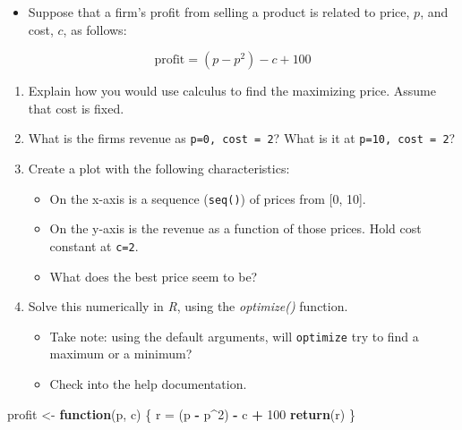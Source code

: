 \documentclass[
]{book}
\newenvironment{Shaded}{\begin{snugshade}}{\end{snugshade}}
\newcommand{\ControlFlowTok}[1]{\textcolor[rgb]{0.13,0.29,0.53}{\textbf{#1}}}
\newcommand{\DecValTok}[1]{\textcolor[rgb]{0.00,0.00,0.81}{#1}}
\newcommand{\FunctionTok}[1]{\textcolor[rgb]{0.13,0.29,0.53}{\textbf{#1}}}
\newcommand{\NormalTok}[1]{#1}
\newcommand{\OtherTok}[1]{\textcolor[rgb]{0.56,0.35,0.01}{#1}}
\newcommand{\SpecialCharTok}[1]{\textcolor[rgb]{0.81,0.36,0.00}{\textbf{#1}}}
\providecommand{\tightlist}{%
  \setlength{\itemsep}{0pt}\setlength{\parskip}{0pt}}
\theoremstyle{definition}
\theoremstyle{definition}
\theoremstyle{definition}
\theoremstyle{definition}
\theoremstyle{remark}
\begin{document}
\begin{itemize}
\tightlist
\item
  Suppose that a firm's profit from selling a product is related to price, \(p\), and cost, \(c\), as follows:
\end{itemize}

\[ 
\text{profit} = (p - p^2) - c + 100
\]

\begin{enumerate}
\def\labelenumi{\arabic{enumi}.}
\item
  Explain how you would use calculus to find the maximizing price. Assume that cost is fixed.
\item
  What is the firms revenue as \texttt{p=0,\ cost\ =\ 2}? What is it at \texttt{p=10,\ cost\ =\ 2}?
\item
  Create a plot with the following characteristics:

  \begin{itemize}
  \tightlist
  \item
    On the x-axis is a sequence (\texttt{seq()}) of prices from {[}0, 10{]}.
  \item
    On the y-axis is the revenue as a function of those prices. Hold cost constant at \texttt{c=2}.\\
  \item
    What does the best price seem to be?
  \end{itemize}
\item
  Solve this numerically in \emph{R}, using the \emph{optimize()} function.

  \begin{itemize}
  \tightlist
  \item
    Take note: using the default arguments, will \texttt{optimize} try to find a maximum or a minimum?
  \item
    Check into the help documentation.
  \end{itemize}
\end{enumerate}

\begin{Shaded}
\begin{Highlighting}[]
\NormalTok{profit }\OtherTok{\textless{}{-}} \ControlFlowTok{function}\NormalTok{(p, c) \{ }
\NormalTok{  r }\OtherTok{=}\NormalTok{ (p }\SpecialCharTok{{-}}\NormalTok{ p}\SpecialCharTok{\^{}}\DecValTok{2}\NormalTok{) }\SpecialCharTok{{-}}\NormalTok{ c }\SpecialCharTok{+} \DecValTok{100}
  \FunctionTok{return}\NormalTok{(r) }
\NormalTok{  \} }
\end{Highlighting}
\end{Shaded}
\end{document}
